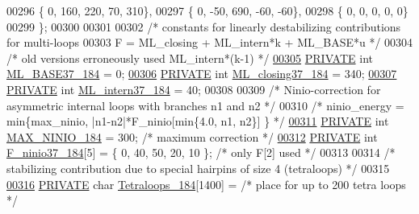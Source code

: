 \begin{DoxyCode}
00296    \{   0,  160,  220,   70,  310\},
00297    \{   0,  -50,  690,  -60,  -60\},
00298    \{   0,    0,    0,    0,   0\}
00299 \};
00300 
00301 
00302 \textcolor{comment}{/* constants for linearly destabilizing contributions for multi-loops}
00303 \textcolor{comment}{   F = ML\_closing + ML\_intern*k + ML\_BASE*u  */}
00304 \textcolor{comment}{/* old versions erroneously used ML\_intern*(k-1) */}
\mbox{\hyperlink{1_88_84__epars_8h_acb9c8c0d18c803468fb106377df8fdb1}{00305}} \mbox{\hyperlink{edit__cost_8h_a5e151c615eda34903514212f05a5ccf8}{PRIVATE}} \textcolor{keywordtype}{int} \mbox{\hyperlink{1_88_84__epars_8h_acb9c8c0d18c803468fb106377df8fdb1}{ML\_BASE37\_184}} = 0;
\mbox{\hyperlink{1_88_84__epars_8h_ae0ca8df5fc307548dab9fe97fa043ed2}{00306}} \mbox{\hyperlink{edit__cost_8h_a5e151c615eda34903514212f05a5ccf8}{PRIVATE}} \textcolor{keywordtype}{int} \mbox{\hyperlink{1_88_84__epars_8h_ae0ca8df5fc307548dab9fe97fa043ed2}{ML\_closing37\_184}} = 340;
\mbox{\hyperlink{1_88_84__epars_8h_ada2f69ac00d5e7497374736aae8d403c}{00307}} \mbox{\hyperlink{edit__cost_8h_a5e151c615eda34903514212f05a5ccf8}{PRIVATE}} \textcolor{keywordtype}{int} \mbox{\hyperlink{1_88_84__epars_8h_ada2f69ac00d5e7497374736aae8d403c}{ML\_intern37\_184}} =  40;
00308 
00309 \textcolor{comment}{/* Ninio-correction for asymmetric internal loops with branches n1 and n2 */}
00310 \textcolor{comment}{/*    ninio\_energy = min\{max\_ninio, |n1-n2|*F\_ninio[min\{4.0, n1, n2\}] \} */}
\mbox{\hyperlink{1_88_84__epars_8h_aaf409a10382c3468988f6e877b7adbf4}{00311}} \mbox{\hyperlink{edit__cost_8h_a5e151c615eda34903514212f05a5ccf8}{PRIVATE}} \textcolor{keywordtype}{int} \mbox{\hyperlink{1_88_84__epars_8h_aaf409a10382c3468988f6e877b7adbf4}{MAX\_NINIO\_184}} = 300;                   \textcolor{comment}{/* maximum correction */}
\mbox{\hyperlink{1_88_84__epars_8h_a342dc18cb7ef70b91b1d3d3df6bde7d6}{00312}} \mbox{\hyperlink{edit__cost_8h_a5e151c615eda34903514212f05a5ccf8}{PRIVATE}} \textcolor{keywordtype}{int} \mbox{\hyperlink{1_88_84__epars_8h_a342dc18cb7ef70b91b1d3d3df6bde7d6}{F\_ninio37\_184}}[5] = \{ 0, 40, 50, 20, 10 \};      \textcolor{comment}{/* only F[2] used */}
00313 
00314 \textcolor{comment}{/* stabilizing contribution due to special hairpins of size 4 (tetraloops) */}
00315 
\mbox{\hyperlink{1_88_84__epars_8h_af36cc09268d1f18dd367ca54d6c9084f}{00316}} \mbox{\hyperlink{edit__cost_8h_a5e151c615eda34903514212f05a5ccf8}{PRIVATE}} \textcolor{keywordtype}{char} \mbox{\hyperlink{1_88_84__epars_8h_af36cc09268d1f18dd367ca54d6c9084f}{Tetraloops\_184}}[1400] =  \textcolor{comment}{/* place for up to 200 tetra loops */}

\end{DoxyCode}
